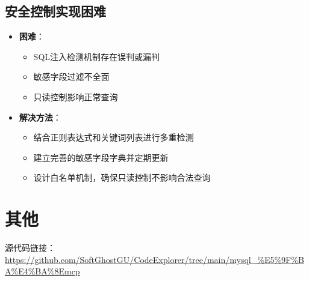 \documentclass{article}
\begin{document}
	\subsection{安全控制实现困难}
	\begin{itemize}
		\item \textbf{困难}：
		\begin{itemize}
			\item SQL注入检测机制存在误判或漏判
			\item 敏感字段过滤不全面
			\item 只读控制影响正常查询
		\end{itemize}
		
		\item \textbf{解决方法}：
		\begin{itemize}
			\item 结合正则表达式和关键词列表进行多重检测
			\item 建立完善的敏感字段字典并定期更新
			\item 设计白名单机制，确保只读控制不影响合法查询
		\end{itemize}
	\end{itemize}
	
	\section{其他}
	
	源代码链接：\url{https://github.com/SoftGhostGU/CodeExplorer/tree/main/mysql_%E5%9F%BA%E4%BA%8Emcp}
	
\end{document}
